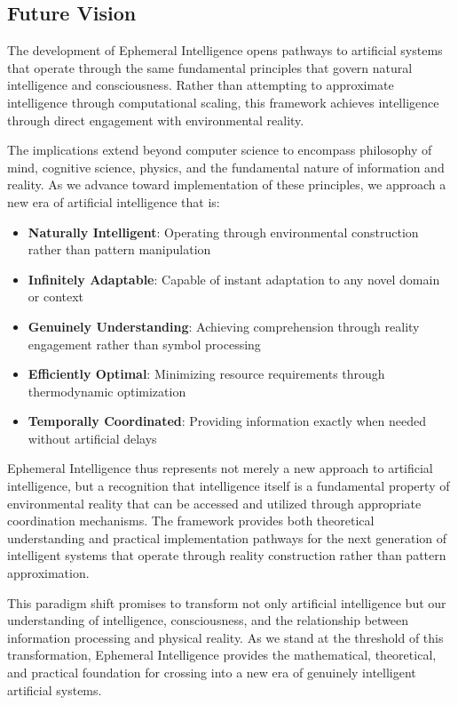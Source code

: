 \documentclass[12pt,a4paper]{article}
\begin{document}
\subsection{Future Vision}

The development of Ephemeral Intelligence opens pathways to artificial systems that operate through the same fundamental principles that govern natural intelligence and consciousness. Rather than attempting to approximate intelligence through computational scaling, this framework achieves intelligence through direct engagement with environmental reality.

The implications extend beyond computer science to encompass philosophy of mind, cognitive science, physics, and the fundamental nature of information and reality. As we advance toward implementation of these principles, we approach a new era of artificial intelligence that is:

\begin{itemize}
\item \textbf{Naturally Intelligent}: Operating through environmental construction rather than pattern manipulation
\item \textbf{Infinitely Adaptable}: Capable of instant adaptation to any novel domain or context
\item \textbf{Genuinely Understanding}: Achieving comprehension through reality engagement rather than symbol processing
\item \textbf{Efficiently Optimal}: Minimizing resource requirements through thermodynamic optimization
\item \textbf{Temporally Coordinated}: Providing information exactly when needed without artificial delays
\end{itemize}

Ephemeral Intelligence thus represents not merely a new approach to artificial intelligence, but a recognition that intelligence itself is a fundamental property of environmental reality that can be accessed and utilized through appropriate coordination mechanisms. The framework provides both theoretical understanding and practical implementation pathways for the next generation of intelligent systems that operate through reality construction rather than pattern approximation.

This paradigm shift promises to transform not only artificial intelligence but our understanding of intelligence, consciousness, and the relationship between information processing and physical reality. As we stand at the threshold of this transformation, Ephemeral Intelligence provides the mathematical, theoretical, and practical foundation for crossing into a new era of genuinely intelligent artificial systems.
\end{document}
